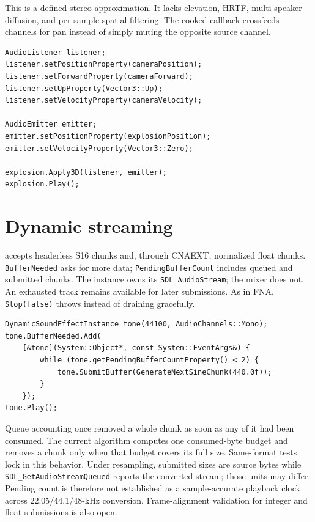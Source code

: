 This is a defined stereo approximation. It lacks elevation, HRTF, multi-speaker diffusion, and
per-sample spatial filtering. The cooked callback crossfeeds channels for pan instead of simply
muting the opposite source channel.

\begin{lstlisting}
AudioListener listener;
listener.setPositionProperty(cameraPosition);
listener.setForwardProperty(cameraForward);
listener.setUpProperty(Vector3::Up);
listener.setVelocityProperty(cameraVelocity);

AudioEmitter emitter;
emitter.setPositionProperty(explosionPosition);
emitter.setVelocityProperty(Vector3::Zero);

explosion.Apply3D(listener, emitter);
explosion.Play();
\end{lstlisting}

\section{Dynamic streaming}

 accepts headerless S16 chunks and, through CNAEXT,
normalized float chunks. \texttt{BufferNeeded} asks for more data;
\texttt{PendingBufferCount} includes queued and submitted chunks. The instance owns its
\texttt{SDL\_AudioStream}; the mixer does not. An exhausted track remains available for later
submissions. As in FNA, \texttt{Stop(false)} throws instead of draining gracefully.

\begin{lstlisting}
DynamicSoundEffectInstance tone(44100, AudioChannels::Mono);
tone.BufferNeeded.Add(
    [&tone](System::Object*, const System::EventArgs&) {
        while (tone.getPendingBufferCountProperty() < 2) {
            tone.SubmitBuffer(GenerateNextSineChunk(440.0f));
        }
    });
tone.Play();
\end{lstlisting}

Queue accounting once removed a whole chunk as soon as any of it had been consumed. The current
algorithm computes one consumed-byte budget and removes a chunk only when that budget covers its
full size. Same-format tests lock in this behavior. Under resampling, submitted sizes are source
bytes while \texttt{SDL\_GetAudioStreamQueued} reports the converted stream; those units may
differ. Pending count is therefore not established as a sample-accurate playback clock across
22.05/44.1/48-kHz conversion. Frame-alignment validation for integer and float submissions is
also open.

